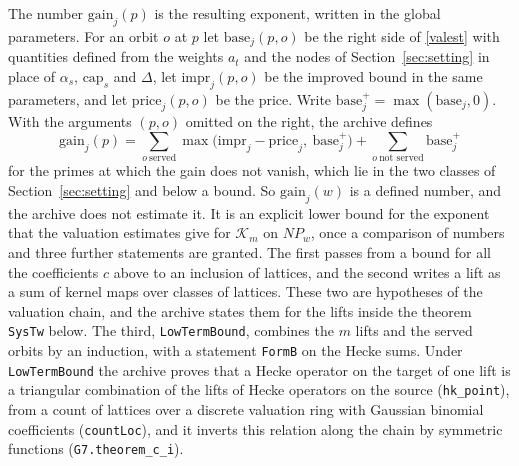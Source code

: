 \documentclass[11pt,letterpaper]{article}
\numberwithin{equation}{section}
\begin{document}
The number $\mathrm{gain}_j(p)$ is the resulting exponent, written in the global parameters. For an orbit $o$ at $p$ let $\mathrm{base}_j(p,o)$ be the right side of \eqref{valest} with quantities defined from the weights $a_t$ and the nodes of Section~\ref{sec:setting} in place of $\alpha_s$, $\mathrm{cap}_s$ and $\Delta$, let $\mathrm{impr}_j(p,o)$ be the improved bound in the same parameters, and let $\mathrm{price}_j(p,o)$ be the price. Write $\mathrm{base}_j^+=\max(\mathrm{base}_j,0)$. With the arguments $(p,o)$ omitted on the right, the archive defines
\begin{equation}\label{gainformula}
\mathrm{gain}_j(p)=\sum_{o\ \mathrm{served}}\max\big(\mathrm{impr}_j-\mathrm{price}_j,\ \mathrm{base}_j^+\big)+\sum_{o\ \text{not served}}\mathrm{base}_j^+
\end{equation}
for the primes at which the gain does not vanish, which lie in the two classes of Section~\ref{sec:setting} and below a bound. So $\mathrm{gain}_j(w)$ is a defined number, and the archive does not estimate it. It is an explicit lower bound for the exponent that the valuation estimates give for $\mathcal K_m$ on $N\!P_w$, once a comparison of numbers and three further statements are granted. The first passes from a bound for all the coefficients $c$ above to an inclusion of lattices, and the second writes a lift as a sum of kernel maps over classes of lattices. These two are hypotheses of the valuation chain, and the archive states them for the lifts inside the theorem \texttt{SysTw} below. The third, \texttt{LowTermBound}, combines the $m$ lifts and the served orbits by an induction, with a statement \texttt{FormB} on the Hecke sums. Under \texttt{LowTermBound} the archive proves that a Hecke operator on the target of one lift is a triangular combination of the lifts of Hecke operators on the source (\texttt{hk\_point}), from a count of lattices over a discrete valuation ring with Gaussian binomial coefficients (\texttt{countLoc}), and it inverts this relation along the chain by symmetric functions (\texttt{G7.theorem\_c\_i}).
\end{document}
